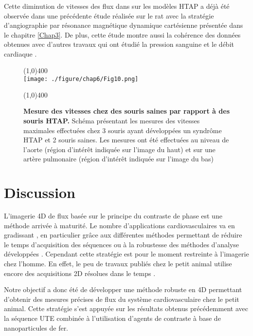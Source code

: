 Cette diminution de vitesses des flux dans sur les modèles HTAP a déjà été observée dans une précédente étude réalisée sur le rat \cite{Dumas2011effect} avec la stratégie d'angiographie par résonance magnétique dynamique cartésienne présentée dans le chapitre \ref{Chap3}. De plus, cette étude montre aussi la cohérence des données obtenues avec d'autres travaux qui ont étudié la pression sanguine et le débit cardiaque \cite{pozeg2003vivo,hessel2006characterization}.

\begin{figure}[H]
\centering
\line(1,0){400} \\
\texttt{[image: ./figure/chap6/Fig10.png]}
\caption[Mesure des vitesses chez des souris saines par rapport à des souris HTAP.]{\label{fig:CarteVitesse}\textbf{Mesure des vitesses chez des souris saines par rapport à des souris HTAP.} Schéma présentant les mesures des vitesses maximales effectuées chez 3 souris ayant développées un syndrôme HTAP et 2 souris saines. Les mesures ont été effectuées au niveau de l'aorte (région d'intérêt indiquée sur l'image du haut) et sur une artère pulmonaire (région d'intérêt indiquée sur l'image du bas)}
\line(1,0){400} \\ 
\end{figure}

\section{Discussion}

L'imagerie 4D de flux basée sur le principe du contraste de phase est une méthode arrivée à maturité. Le nombre d'applications cardiovasculaires va en gradissant \cite{Stankovic:2014aa,Garcia:2014aa,Petersson:2015aa}, en particulier grâce aux différentes méthodes permettant de réduire le temps d'acquisition des séquences \cite{Liu:2014aa} ou à la robustesse des méthodes d'analyse développées \cite{Eriksson:2010aa}. Cependant cette stratégie est pour le moment restreinte à l'imagerie chez l'homme. En effet, le peu de travaux publiés chez le petit animal utilise encore des acquisitions 2D résolues dans le temps \cite{Zhao:2009ng}. 

Notre objectif a donc été de développer une méthode robuste en 4D permettant d’obtenir des mesures précises de flux du système cardiovasculaire chez le petit animal. Cette stratégie s’est appuyée sur les résultats obtenus précédemment avec la séquence UTE combinée à l'utilisation d'agents de contraste à base de nanoparticules de fer.

